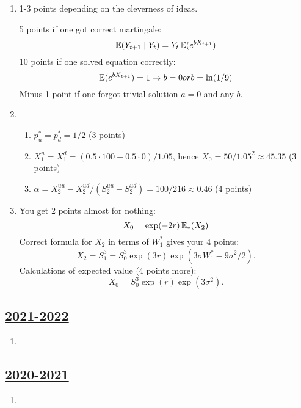\begin{enumerate}
\item
 1-3 points depending on the cleverness of ideas.
 
 5 points if one got correct martingale:
 \[
 \operatorname{\mathbb{E}}(Y_{t+1} \mid Y_t) = Y_t \operatorname{\mathbb{E}}(e^{b X_{t+1}})
 \]    
10 points if one solved equation correctly:
\[
\operatorname{\mathbb{E}}(e^{b X_{t+1}}) = 1 \rightarrow b = 0 or b = \ln(1/9)
\]
Minus 1 point if one forgot trivial solution $a = 0$ and any $b$.

\item \begin{enumerate}
    \item $p^*_u = p^*_d = 1/2$ (3 points)
    \item $X_1^u = X_1^d = (0.5\cdot 100 + 0.5\cdot 0) / 1.05$, hence $X_0 = 50/1.05^2 \approx 45.35$ (3 points)
    \item $\alpha = X_2^{uu} - X_2^{ud} / (S_2^{uu} - S_2^{ud}) = 100/216 \approx 0.46$ (4 points)
\end{enumerate}

\item 
You get 2 points almost for nothing:
\[
X_0 = \exp(-2r) \operatorname{\mathbb{E}}_{*}(X_2)    
\]
Correct formula for $X_2$ in terms of $W_1^*$ gives your 4 points:
\[
X_2 = S_1^3 = S_0^3 \exp(3r)\exp(3\sigma W_1^* - 9\sigma^2/2).    
\]
Calculations of expected value (4 points more):
\[
X_0 = S_0^3 \exp(r)\exp(3\sigma^2).    
\]

\end{enumerate}

\subsection[2021-2022]{\hyperref[sec:kr_02_2021_2022]{2021-2022}}
\label{sec:sol_kr_02_2021_2022} %



\begin{enumerate}

\item 


\end{enumerate}
    

\subsection[2020-2021]{\hyperref[sec:kr_02_2020_2021]{2020-2021}}
\label{sec:sol_kr_02_2020_2021} %



\begin{enumerate}
    
    
    
    \item
 
 
\end{enumerate}


